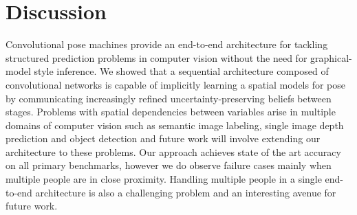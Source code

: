 \documentclass[10pt,twocolumn,letterpaper]{article}
\begin{document}
\vspace{-10pt}\section{Discussion}\vspace{-5pt}%
Convolutional pose machines provide an end-to-end architecture for tackling structured prediction problems in computer vision without the need for graphical-model style inference. We showed that a sequential architecture composed of convolutional networks is capable of implicitly learning a spatial models for pose by communicating increasingly refined uncertainty-preserving beliefs between stages. Problems with spatial dependencies between variables arise in multiple domains of computer vision such as semantic image labeling, single image depth prediction and object detection and future work will involve extending our architecture to these problems.
Our approach achieves state of the art accuracy on all primary benchmarks, however we do observe failure cases mainly when multiple people are in close proximity. Handling multiple people in a single end-to-end architecture is also a challenging problem and an interesting avenue for future work.

{\small


}
\end{document}
